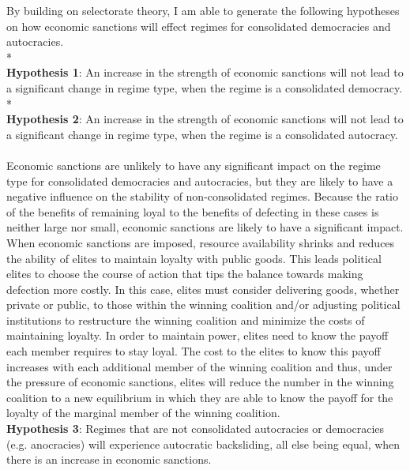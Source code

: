 \documentclass[a4paper]{article}\usepackage[]{graphicx}\usepackage[]{color}
\begin{document}
\par
By building on selectorate theory, I am able to generate the following hypotheses on how economic sanctions will effect regimes for consolidated democracies and autocracies. \\*
\\
\textbf{Hypothesis 1}: An increase in the strength of economic sanctions will not lead to a significant change in regime type, when the regime is a consolidated democracy. \\*
\\
\textbf{Hypothesis 2}: An increase in the strength of economic sanctions will not lead to a significant change in regime type, when the regime is a consolidated autocracy.\\ 
\\
Economic sanctions are unlikely to have any significant impact on the regime type for consolidated democracies and autocracies, but they are likely to have a negative influence on the stability of non-consolidated regimes. Because the ratio of the benefits of remaining loyal to the benefits of defecting in these cases is neither large nor small, economic sanctions are likely to have a significant impact. When economic sanctions are imposed, resource availability shrinks and reduces the ability of elites to maintain loyalty with public goods. This leads political elites to choose the course of action that tips the balance towards making defection more costly. In this case, elites must consider delivering goods, whether private or public, to those within the winning coalition and/or adjusting political institutions to restructure the winning coalition and minimize the costs of maintaining loyalty. In order to maintain power, elites need to know the payoff each member requires to stay loyal. The cost to the elites to know this payoff increases with each additional member of the winning coalition and thus, under the pressure of economic sanctions, elites will reduce the number in the winning coalition to a new equilibrium in which they are able to know the payoff for the loyalty of the marginal member of the winning coalition.  \\

\textbf{Hypothesis 3}: Regimes that are not consolidated autocracies or democracies (e.g. anocracies) will experience autocratic backsliding, all else being equal, when there is an increase in economic sanctions. \\
\end{document}
